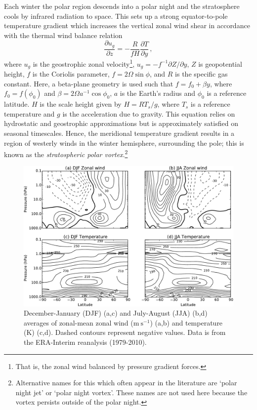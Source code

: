 Each winter the polar region descends into a polar night and the stratosphere
cools by infrared radiation to space. This sets up a strong equator-to-pole
temperature gradient which increases the vertical zonal wind shear in accordance
with the thermal wind balance relation
\begin{equation}
\frac{\partial u_g}{\partial z} = -\frac{R}{fH}\frac{\partial T}{\partial y} \,, 
\end{equation} 
where $u_g$ is the geostrophic zonal velocity\footnote{That is, the zonal wind
  balanced by pressure gradient forces.}, $u_g = -f^{-1}\partial Z/\partial y$,
$Z$ is geopotential height, $f$ is the Coriolis parameter, $f=2\Omega\sin\phi$,
and $R$ is the specific gas constant. Here, a beta-plane geometry is used such
that $f=f_0+\beta y$, where $f_0=f(\phi_0)$ and
$\beta = 2\Omega a^{-1}\cos\phi_0$, $a$ is the Earth's radius and $\phi_{0}$ is
a reference latitude. $H$ is the scale height given by $H = RT_s/g$, where $T_s$
is a reference temperature and $g$ is the acceleration due to gravity. This
equation relies on hydrostatic and geostrophic approximations but is
approximately satisfied on seasonal timescales. Hence, the meridional
temperature gradient results in a region of westerly winds in the winter
hemisphere, surrounding the pole; this is known as the \emph{stratospheric polar
  vortex}.\footnote{Alternative names for this which often appear in the
  literature are `polar night jet' or `polar night vortex'. These names are not
  used here because the vortex persists outside of the polar night.}

\begin{figure}
 \centering
 \noindent\includegraphics[width=\textwidth]{figures/chapter-intro/zmzw_zmT_clim.pdf}
 \caption[Zonal-mean zonal wind and temperature climatology.]{December-January
   (DJF) (a,c) and July-August (JJA) (b,d) averages of zonal-mean zonal wind
   ($\mathrm{m~s^{-1}}$) (a,b) and temperature (K) (c,d). Dashed contours
   represent negative values. Data is from the ERA-Interim reanalysis
   (1979-2010).}
 \label{fig:zmzw_zmT_clim}
\end{figure}


